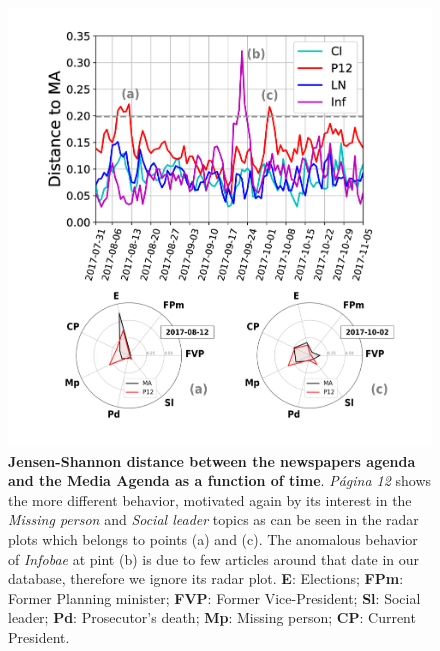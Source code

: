 \documentclass{bmcart}
\begin{document}
\begin{backmatter}
\begin{figure}[h!]
\includegraphics[width = \textwidth]{Fig6.pdf}
\caption{\textbf{Jensen-Shannon distance between the newspapers agenda and the Media Agenda as a function of time}. \emph{P\'agina 12} shows the more different behavior, motivated again by its interest in the \emph{Missing person} and \emph{Social leader} topics as can be seen in the radar plots which belongs to points (a) and (c). The anomalous behavior of \emph{Infobae} at pint (b) is due to few articles around that date in our database, therefore we ignore its radar plot. \textbf{E}: Elections; \textbf{FPm}: Former Planning minister; \textbf{FVP}: Former Vice-President; \textbf{Sl}: Social leader; \textbf{Pd}: Prosecutor's death; \textbf{Mp}: Missing person; \textbf{CP}: Current President.}
\label{fig:jensen_shannon_news}
\end{figure}


\end{backmatter}
\end{document}
